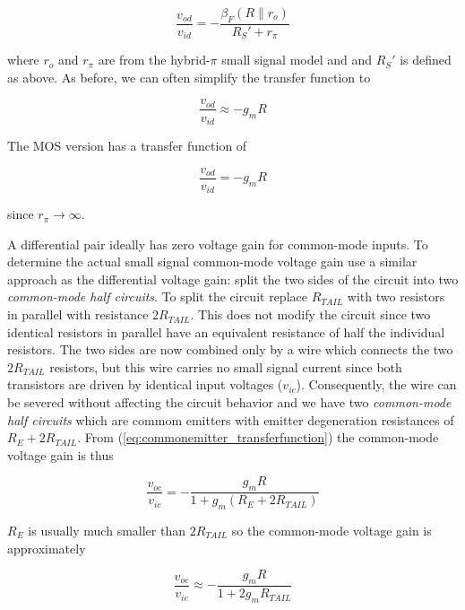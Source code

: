 \begin{equation}
\frac{v_{od}}{v_{id}} = -\frac{\beta_{F} (R \parallel r_{o})}{R_{S}' + r_{\pi}}
\end{equation}

where $r_{o}$ and $r_{\pi}$ are from the hybrid-$\pi$ small signal model and and $R_{S}'$ is defined as above. As before, we can often simplify the transfer function to

\begin{equation}
\frac{v_{od}}{v_{id}} \approx -g_m R
\label{eq:resistivediffpair_diff_gain_approx}
\end{equation}

The MOS version has a transfer function of

\begin{equation}
\frac{v_{od}}{v_{id}} = -g_{m}R
\end{equation}

since $r_{\pi} \to \infty$.

A differential pair ideally has zero voltage gain for common-mode inputs.
To determine the actual small signal common-mode voltage gain use a similar approach as the differential voltage gain:
split the two sides of the circuit into two \textit{common-mode half circuits}.
To split the circuit replace $R_{TAIL}$ with two resistors in parallel with resistance $2R_{TAIL}$.
This does not modify the circuit since two identical resistors in parallel have an equivalent resistance of half the individual resistors.
The two sides are now combined only by a wire which connects the two $2R_{TAIL}$ resistors, but this wire carries no small signal current since both transistors are driven by identical input voltages ($v_{ic}$). \autocite[228]{analysis-design-analog-ics}
Consequently, the wire can be severed without affecting the circuit behavior and we have two \textit{common-mode half circuits} which are commom emitters with emitter degeneration resistances of $R_{E}+2R_{TAIL}$.
From (\ref{eq:commonemitter_transferfunction}) the common-mode voltage gain is thus

\begin{equation}
\frac{v_{oc}}{v_{ic}} = -\frac{g_{m}R}{1+g_{m}(R_{E}+2R_{TAIL})}
\label{eq:resistivediffpair_cm_gain}
\end{equation}

$R_{E}$ is usually much smaller than $2R_{TAIL}$ so the common-mode voltage gain is approximately

\begin{equation}
\frac{v_{oc}}{v_{ic}} \approx -\frac{g_{m}R}{1+2g_{m}R_{TAIL}}
\label{eq:resistivediffpair_cm_gain_approx}
\end{equation}

